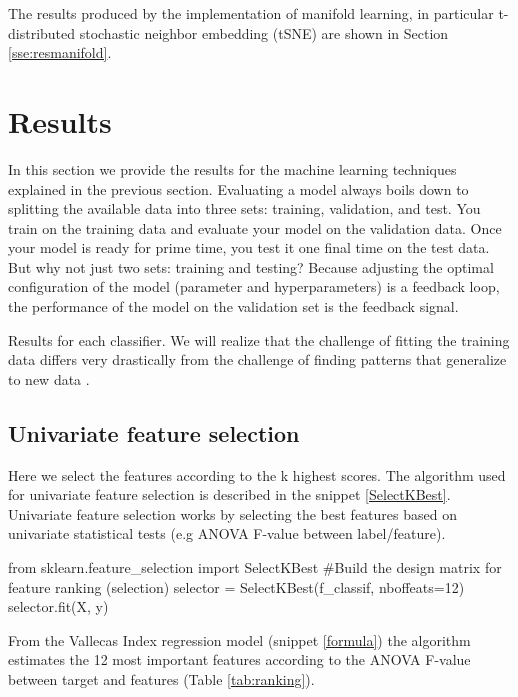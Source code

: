 \documentclass[11pt]{article}
\theoremstyle{definition}
\theoremstyle{remark}
\begin{document}
The results produced by the implementation of manifold learning, in particular t-distributed stochastic neighbor embedding (tSNE) are shown in Section \ref{sse:resmanifold}.


\newpage

\section{Results}
\label{se:res}

In this section we provide the results for the machine learning techniques explained in the previous section.
Evaluating a model always boils down to splitting the available data into three sets: training, validation, and test. You train on the training data and evaluate your model on the validation data. Once your model is ready for prime time, you test it one final time on the test data. 
But why not just two sets: training and testing? Because adjusting the optimal configuration of the model (parameter and hyperparameters) is a feedback loop, the performance of the model on the validation set is the feedback signal.

Results for each classifier. We will realize that the challenge of fitting the training data differs very drastically from the challenge of finding patterns that generalize to new data \cite{goodfellow2016deep}.

\subsection{Univariate feature selection}
\label{se:reslinreg}

Here we select the features according to the k highest scores. The algorithm used for univariate feature selection is described in the snippet \ref{SelectKBest}. Univariate feature selection works by selecting the best features based on univariate statistical tests (e.g ANOVA F-value between label/feature).

\begin{code}[caption=SelectKBest, label=SelectKBest]
from sklearn.feature_selection import SelectKBest
#Build the design matrix for feature ranking (selection)
selector = SelectKBest(f_classif, nboffeats=12)
selector.fit(X, y)
\end{code}

From the Vallecas Index regression model (snippet \ref{formula}) the algorithm estimates the 12 most important features according to the ANOVA F-value between target and features (Table \ref{tab:ranking}).
\end{document}
